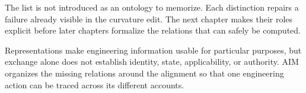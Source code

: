 The list is not introduced as an ontology to memorize. Each distinction repairs
a failure already visible in the curvature edit. The next chapter makes their
roles explicit before later chapters formalize the relations that can safely be
computed.

\begin{summary}
Representations make engineering information usable for particular purposes,
but exchange alone does not establish identity, state, applicability, or
authority. AIM organizes the missing relations around the alignment so that one
engineering action can be traced across its different accounts.
\end{summary}
